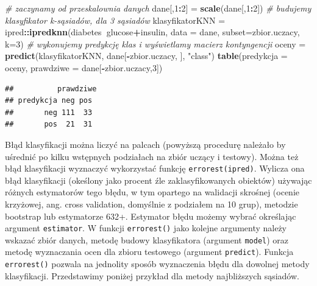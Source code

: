 \documentclass[polish,]{book}
\newenvironment{Shaded}{\begin{snugshade}}{\end{snugshade}}
\newcommand{\CommentTok}[1]{\textcolor[rgb]{0.56,0.35,0.01}{\textit{#1}}}
\newcommand{\DataTypeTok}[1]{\textcolor[rgb]{0.13,0.29,0.53}{#1}}
\newcommand{\DecValTok}[1]{\textcolor[rgb]{0.00,0.00,0.81}{#1}}
\newcommand{\KeywordTok}[1]{\textcolor[rgb]{0.13,0.29,0.53}{\textbf{#1}}}
\newcommand{\NormalTok}[1]{#1}
\newcommand{\OperatorTok}[1]{\textcolor[rgb]{0.81,0.36,0.00}{\textbf{#1}}}
\newcommand{\StringTok}[1]{\textcolor[rgb]{0.31,0.60,0.02}{#1}}
\begin{document}
\begin{Shaded}
\begin{Highlighting}[]
\CommentTok{# zaczynamy od przeskalownia danych}
\NormalTok{dane[,}\DecValTok{1}\OperatorTok{:}\DecValTok{2}\NormalTok{] =}\StringTok{ }\KeywordTok{scale}\NormalTok{(dane[,}\DecValTok{1}\OperatorTok{:}\DecValTok{2}\NormalTok{])}
\CommentTok{# budujemy klasyfikator k-sąsiadów, dla 3 sąsiadów}
\NormalTok{klasyfikatorKNN =}\StringTok{ }\NormalTok{ipred}\OperatorTok{::}\KeywordTok{ipredknn}\NormalTok{(diabetes}\OperatorTok{~}\NormalTok{glucose}\OperatorTok{+}\NormalTok{insulin, }
                                  \DataTypeTok{data =}\NormalTok{ dane, }\DataTypeTok{subset=}\NormalTok{zbior.uczacy, }\DataTypeTok{k=}\DecValTok{3}\NormalTok{)}
\CommentTok{# wykonujemy predykcję klas i wyświetlamy macierz kontyngencji}
\NormalTok{oceny =}\StringTok{ }\KeywordTok{predict}\NormalTok{(klasyfikatorKNN, dane[}\OperatorTok{-}\NormalTok{zbior.uczacy, ], }\StringTok{"class"}\NormalTok{)}
\KeywordTok{table}\NormalTok{(}\DataTypeTok{predykcja =}\NormalTok{ oceny, }\DataTypeTok{prawdziwe =}\NormalTok{ dane[}\OperatorTok{-}\NormalTok{zbior.uczacy,}\DecValTok{3}\NormalTok{])}
\end{Highlighting}
\end{Shaded}

\begin{verbatim}
##          prawdziwe
## predykcja neg pos
##       neg 111  33
##       pos  21  31
\end{verbatim}

Błąd klasyfikacji można liczyć na palcach (powyższą procedurę należało by uśrednić po kilku wstępnych podziałach na zbiór uczący i testowy). Można też błąd klasyfikacji wyznaczyć wykorzystać funkcję \texttt{errorest(ipred)}. Wylicza ona błąd klasyfikacji (okeślony jako procent źle zaklasyfikowanych obiektów) używając różnych
estymatorów tego błędu, w tym opartego na walidacji skrośnej (ocenie krzyżowej,
ang. cross validation, domyślnie z podziałem na 10 grup), metodzie bootstrap lub estymatorze 632+. Estymator błędu możemy wybrać określając argument \texttt{estimator}.
W funkcji \texttt{errorest()} jako kolejne argumenty należy wskazać zbiór danych, metodę
budowy klasyfikatora (argument \texttt{model}) oraz metodę wyznaczania ocen dla zbioru
testowego (argument \texttt{predict}). Funkcja \texttt{errorest()} pozwala na jednolity sposób
wyznaczenia błędu dla dowolnej metody klasyfikacji. Przedstawimy poniżej przykład
dla metody najbliższych sąsiadów.
\end{document}
